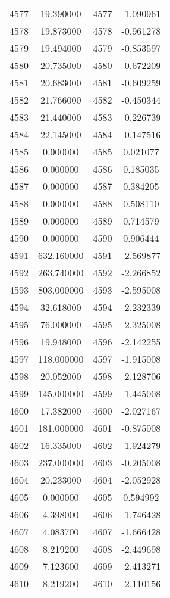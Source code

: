 \documentclass[12pt]{article}
\begin{document}
\begin{longtable}{@{}cccc@{}}
4577 & 19.390000 & 4577 & -1.090961 \\
4578 & 19.873000 & 4578 & -0.961278 \\
4579 & 19.494000 & 4579 & -0.853597 \\
4580 & 20.735000 & 4580 & -0.672209 \\
4581 & 20.683000 & 4581 & -0.609259 \\
4582 & 21.766000 & 4582 & -0.450344 \\
4583 & 21.440000 & 4583 & -0.226739 \\
4584 & 22.145000 & 4584 & -0.147516 \\
4585 & 0.000000 & 4585 & 0.021077 \\
4586 & 0.000000 & 4586 & 0.185035 \\
4587 & 0.000000 & 4587 & 0.384205 \\
4588 & 0.000000 & 4588 & 0.508110 \\
4589 & 0.000000 & 4589 & 0.714579 \\
4590 & 0.000000 & 4590 & 0.906444 \\
4591 & 632.160000 & 4591 & -2.569877 \\
4592 & 263.740000 & 4592 & -2.266852 \\
4593 & 803.000000 & 4593 & -2.595008 \\
4594 & 32.618000 & 4594 & -2.232339 \\
4595 & 76.000000 & 4595 & -2.325008 \\
4596 & 19.948000 & 4596 & -2.142255 \\
4597 & 118.000000 & 4597 & -1.915008 \\
4598 & 20.052000 & 4598 & -2.128706 \\
4599 & 145.000000 & 4599 & -1.445008 \\
4600 & 17.382000 & 4600 & -2.027167 \\
4601 & 181.000000 & 4601 & -0.875008 \\
4602 & 16.335000 & 4602 & -1.924279 \\
4603 & 237.000000 & 4603 & -0.205008 \\
4604 & 20.233000 & 4604 & -2.052928 \\
4605 & 0.000000 & 4605 & 0.594992 \\
4606 & 4.398000 & 4606 & -1.746428 \\
4607 & 4.083700 & 4607 & -1.666428 \\
4608 & 8.219200 & 4608 & -2.449698 \\
4609 & 7.123600 & 4609 & -2.413271 \\
4610 & 8.219200 & 4610 & -2.110156 \\

\end{longtable}
\end{document}

